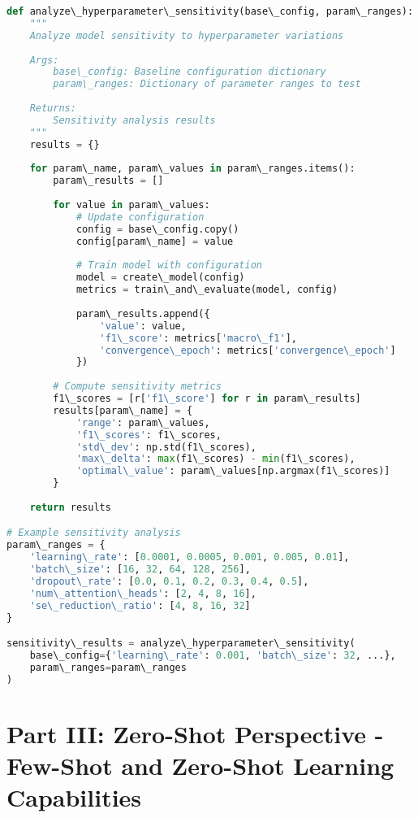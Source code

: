 \documentclass[journal]{IEEEtran}
\begin{document}
\begin{lstlisting}[language=Python, caption=Hyperparameter Sensitivity Analysis]
def analyze\_hyperparameter\_sensitivity(base\_config, param\_ranges):
    """
    Analyze model sensitivity to hyperparameter variations
    
    Args:
        base\_config: Baseline configuration dictionary
        param\_ranges: Dictionary of parameter ranges to test
    
    Returns:
        Sensitivity analysis results
    """
    results = {}
    
    for param\_name, param\_values in param\_ranges.items():
        param\_results = []
        
        for value in param\_values:
            # Update configuration
            config = base\_config.copy()
            config[param\_name] = value
            
            # Train model with configuration
            model = create\_model(config)
            metrics = train\_and\_evaluate(model, config)
            
            param\_results.append({
                'value': value,
                'f1\_score': metrics['macro\_f1'],
                'convergence\_epoch': metrics['convergence\_epoch']
            })
        
        # Compute sensitivity metrics
        f1\_scores = [r['f1\_score'] for r in param\_results]
        results[param\_name] = {
            'range': param\_values,
            'f1\_scores': f1\_scores,
            'std\_dev': np.std(f1\_scores),
            'max\_delta': max(f1\_scores) - min(f1\_scores),
            'optimal\_value': param\_values[np.argmax(f1\_scores)]
        }
    
    return results

# Example sensitivity analysis
param\_ranges = {
    'learning\_rate': [0.0001, 0.0005, 0.001, 0.005, 0.01],
    'batch\_size': [16, 32, 64, 128, 256],
    'dropout\_rate': [0.0, 0.1, 0.2, 0.3, 0.4, 0.5],
    'num\_attention\_heads': [2, 4, 8, 16],
    'se\_reduction\_ratio': [4, 8, 16, 32]
}

sensitivity\_results = analyze\_hyperparameter\_sensitivity(
    base\_config={'learning\_rate': 0.001, 'batch\_size': 32, ...},
    param\_ranges=param\_ranges
)
\end{lstlisting}

\section{Part III: Zero-Shot Perspective - Few-Shot and Zero-Shot Learning Capabilities}
\end{document}

